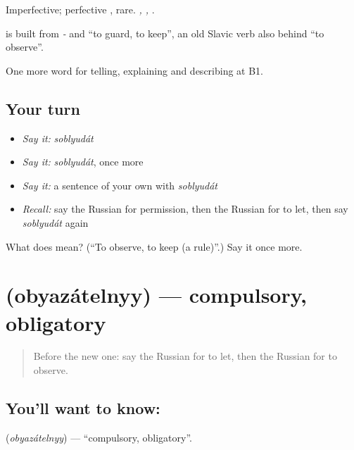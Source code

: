 Imperfective; perfective \emph{}, rare. \emph{ , , }.

\begin{cousinweb}
\textbf{} is built from \emph{-} and \emph{} \textquotedblleft{}to guard, to keep\textquotedblright{}, an old Slavic verb also behind \emph{} \textquotedblleft{}to observe\textquotedblright{}.
\end{cousinweb}

\begin{grammarlens}[title={What you've built}]
One more word for telling, explaining and describing at B1.
\end{grammarlens}

\subsection*{Your turn}
\begin{itemize}
\raggedright
  \item \emph{Say it:} \emph{soblyudát}
  \item \emph{Say it:} \emph{soblyudát}, once more
  \item \emph{Say it:} a sentence of your own with \emph{soblyudát}
  \item \emph{Recall:} say the Russian for permission, then the Russian for to let, then say \emph{soblyudát} again
\end{itemize}

\begin{tcolorbox}[breakable,colback=teal!4,colframe=teal!35!black,title={Before you move on}]
What does  mean? (\textquotedblleft{}To observe, to keep (a rule)\textquotedblright{}.) Say it once more.
\end{tcolorbox}
\section[\texorpdfstring{\ru{обязательный} (obyazátelnyy)}{обязательный (obyazátelnyy)}]{ (obyazátelnyy) — compulsory, obligatory}

\label{lesson:RU-C390-obyazatelnyy}



\begin{quote}
Before the new one: say the Russian for to let, then the Russian for to observe.
\end{quote}

\subsection*{You'll want to know: }
\textbf{} (\emph{obyazátelnyy}) — \textquotedblleft{}compulsory, obligatory\textquotedblright{}.

